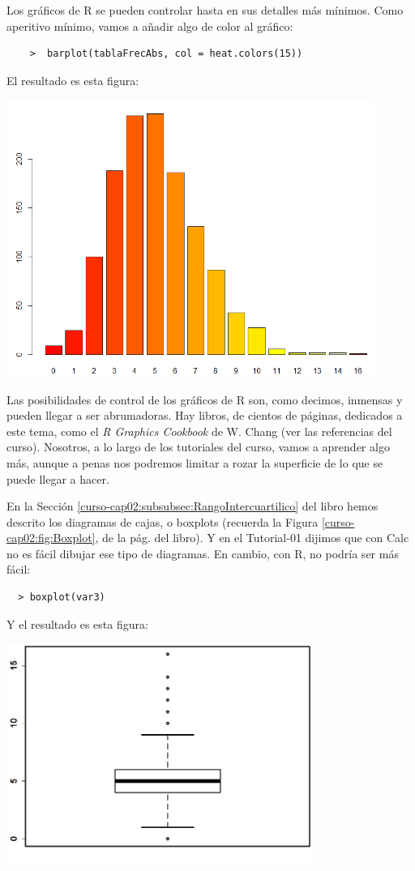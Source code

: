 \documentclass[10pt,a4paper]{article}\usepackage[]{graphicx}\usepackage[]{color}
\newcounter {cont01}
\begin{document}
Los gráficos de R se pueden controlar hasta en sus detalles más mínimos. Como aperitivo mínimo, vamos a añadir algo de color al gráfico:
\begin{verbatim}
    >  barplot(tablaFrecAbs, col = heat.colors(15))
\end{verbatim}
El resultado es esta figura:
    \begin{center}
    \includegraphics[width=12cm]{../fig/Tut02-16.png}
    \end{center}
Las posibilidades de control de los gráficos de R son, como decimos, inmensas y pueden llegar a ser abrumadoras. Hay libros, de cientos de páginas,  dedicados a este tema, como el {\em R Graphics Cookbook} de W. Chang (ver las referencias del curso). Nosotros, a lo largo de los tutoriales del curso, vamos a aprender algo más, aunque a penas nos podremos limitar a rozar la superficie de lo que se puede llegar a hacer.

En la Sección \ref{curso-cap02:subsubsec:RangoIntercuartilico} del libro hemos descrito los diagramas de cajas, o boxplots (recuerda la Figura \ref{curso-cap02:fig:Boxplot}, de la pág. \pageref{curso-cap02:fig:Boxplot} del libro). Y en el Tutorial-01 dijimos que con Calc no es fácil dibujar ese tipo de diagramas. En cambio, con R, no podría ser más fácil:
\begin{verbatim}
  > boxplot(var3)
\end{verbatim}
Y el resultado es esta figura:
\begin{center}
  \includegraphics[width=10cm]{../fig/Tut02-17.png}
\end{center}
\end{document}
